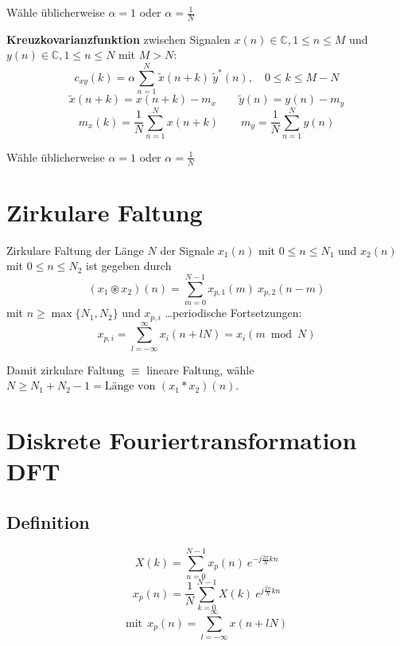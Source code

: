 \documentclass[10pt,a4paper]{article}
\newcommand{\fancythumb}[2]{
	\addthumb{#1}{\large\sffamily\textbf{\space\space#1\vspace{5pt}}}{white}{#2}
}
\begin{document}
\begin{multicols}{2}
\begin{adjustbox}{valign=t,center=0.45\textwidth,margin=1ex,minipage=[t][][t]{0.43\textwidth},bgcolor=white,cfbox=black 1.5pt 0pt 1pt}
		Wähle üblicherweise $\alpha = 1$ oder $\alpha = \frac{1}{N}$
	\end{adjustbox}

	\begin{adjustbox}{valign=t,center=0.45\textwidth,margin=1ex,minipage=[t][][t]{0.43\textwidth},bgcolor=white,cfbox=black 1.5pt 0pt 1pt}
		\textbf{Kreuzkovarianzfunktion} zwischen Signalen $x(n) \in \mathbb C, 1 \leq n \leq M$ und $y(n) \in \mathbb C, 1 \leq n \leq N$ mit $M > N$:
		\footnotesize
		\[ c_{xy}(k) = \alpha \sum_{n = 1}^N \tilde x(n + k) ~ \tilde y^*(n), \quad 0 \leq k \leq M - N \]
		\[ \tilde x(n + k) = x(n + k) - m_x \qquad \tilde y(n) = y(n) - m_y \]
		\[ m_x(k) = \frac{1}{N} \sum_{n = 1}^N x(n+k) \qquad m_y = \frac{1}{N} \sum_{n = 1}^N y(n) \]

		Wähle üblicherweise $\alpha = 1$ oder $\alpha = \frac{1}{N}$
	\end{adjustbox}
\end{multicols}

\section*{Zirkulare Faltung}
Zirkulare Faltung der Länge $N$ der Signale $x_1(n)$ mit $0 \leq n \leq N_1$ und $x_2(n)$ mit $0 \leq n \leq N_2$ ist gegeben durch
\[
	(x_1 \circledast x_2)(n) = \sum_{m = 0}^{N - 1} x_{p, 1}(m) ~ x_{p, 2}(n - m)
\]
mit $n \geq \max \{ N_1, N_2 \}$ und $x_{p, i}$ \ldots periodische Fortsetzungen:
\[
	x_{p, i} = \sum_{l = -\infty}^\infty x_i(n + lN) = x_i(m \bmod N)
\]

Damit zirkulare Faltung $\equiv$ lineare Faltung, wähle $N \geq N_1 + N_2 - 1 = \text{Länge von $(x_1 * x_2)(n)$}$.


\newpage
\fancythumb{DFT}{brown}
\section*{Diskrete Fouriertransformation DFT}
\subsection*{Definition}
\vspace{-1.5em}
\begin{multicols}{3}
	\noindent
	\[ X(k) = \sum_{n = 0}^{N - 1} x_p(n) ~ e^{-j\frac{2\pi}{N}kn} \]
	\[ x_p(n) = \frac{1}{N} \sum_{k = 0}^{N - 1} X(k) ~ e^{j\frac{2\pi}{N}kn} \]
	\[ \text{mit} ~~ x_p(n) = \sum_{l = -\infty}^{\infty} x(n + lN) \]
\end{multicols}
\end{document}
